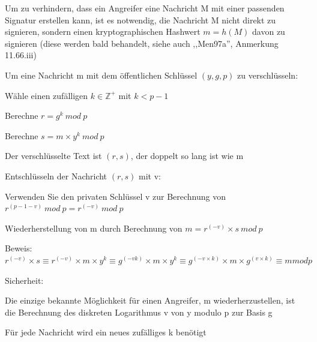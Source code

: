 \documentclass[a4paper]{article}
\begin{document}
\begin{multicols}{3}
\begin{itemize*}
\begin{itemize*}
                  \item Um zu verhindern, dass ein Angreifer eine Nachricht M mit einer passenden Signatur erstellen kann, ist es notwendig, die Nachricht M nicht direkt zu signieren, sondern einen kryptographischen Hashwert $m=h(M)$ davon zu signieren (diese werden bald behandelt, siehe auch ,,Men97a'', Anmerkung 11.66.iii)
            \end{itemize*}
            \item Um eine Nachricht m mit dem öffentlichen Schlüssel $(y,g,p)$ zu
            verschlüsseln:
            \begin{itemize*}
                  \item Wähle einen zufälligen $k\in\mathbb{Z}^+$ mit $k< p-1$
                  \item Berechne $r=g^k\ mod\ p$
                  \item Berechne $s=m\times y^k\ mod\ p$
                  \item Der verschlüsselte Text ist $(r,s)$, der doppelt so lang ist wie m
            \end{itemize*}
            \item Entschlüsseln der Nachricht $(r,s)$ mit v:
            \begin{itemize*}
                  \item Verwenden Sie den privaten Schlüssel v zur Berechnung von $r^{(p-1-v)}\ mod\ p=r^{(-v)}\ mod\ p$
                  \item Wiederherstellung von m durch Berechnung von $m=r^{(-v)}\times s\ mod\ p$
                  \item Beweis: $r^{(-v)}\times s\equiv r^{(-v)} \times m \times y^k\equiv g^{(-vk)}\times m \times y^k\equiv g^{(-v \times k)} \times m\times g^{(v \times k)} \equiv m mod p$
            \end{itemize*}
            \item Sicherheit:
            \begin{itemize*}
                  \item Die einzige bekannte Möglichkeit für einen Angreifer, m wiederherzustellen, ist die Berechnung des diskreten Logarithmus v von y modulo p zur Basis g
                  \item Für jede Nachricht wird ein neues zufälliges k benötigt
            \end{itemize*}
      \end{itemize*}


\end{multicols}
\end{document}
